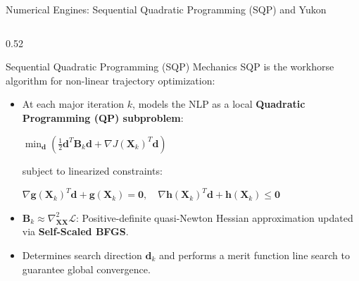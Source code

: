 \documentclass[aspectratio=169, 10pt]{beamer}
\begin{document}
\begin{frame}{Numerical Engines: Sequential Quadratic Programming (SQP) and Yukon}
    \begin{columns}[t]
        \begin{column}{0.52\textwidth}
            \begin{block}{Sequential Quadratic Programming (SQP) Mechanics}
                \scriptsize
                SQP is the workhorse algorithm for non-linear trajectory optimization:
                \begin{itemize}\setlength{\itemsep}{1.5pt}\setlength{\topsep}{2pt}
                    \item At each major iteration $k$, models the NLP as a local \textbf{Quadratic Programming (QP) subproblem}:
                    \par\vspace{2pt}
                    {\centering $\displaystyle \min_{\mathbf{d}} \left( \frac{1}{2} \mathbf{d}^T \mathbf{B}_k \mathbf{d} + \nabla J(\mathbf{X}_k)^T \mathbf{d} \right)$\par}
                    \vspace{2pt}
                    subject to linearized constraints:
                    \par\vspace{2pt}
                    {\centering $\displaystyle \nabla \mathbf{g}(\mathbf{X}_k)^T \mathbf{d} + \mathbf{g}(\mathbf{X}_k) = \mathbf{0}, \quad \nabla \mathbf{h}(\mathbf{X}_k)^T \mathbf{d} + \mathbf{h}(\mathbf{X}_k) \le \mathbf{0}$\par}
                    \vspace{2pt}
                    \item $\mathbf{B}_k \approx \nabla_{\mathbf{X}\mathbf{X}}^2 \mathcal{L}$: Positive-definite quasi-Newton Hessian approximation updated via \textbf{Self-Scaled BFGS}.
                    \item Determines search direction $\mathbf{d}_k$ and performs a merit function line search to guarantee global convergence.
                \end{itemize}
            \end{block}
        \end{column}


\end{columns}
\end{frame}
\end{document}
